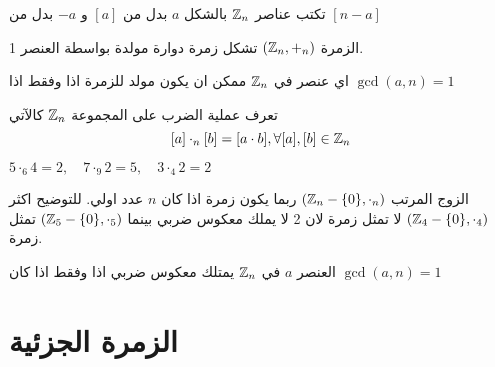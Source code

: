 \begin{note}
	تكتب عناصر $\mathbb{Z}_n$ بالشكل $a$ بدل من $[a]$ و $-a$ بدل من $[n-a]$
\end{note}

\begin{theorem}
	الزمرة $(\mathbb{Z}_n, +_n)$ تشكل زمرة دوارة مولدة بواسطة العنصر 1.
\end{theorem}

\begin{note}
	اي عنصر في $\mathbb{Z}_n$ ممكن ان يكون مولد للزمرة اذا وفقط اذا $\gcd(a,n)=1$
\end{note}
\begin{note}
 تعرف عملية الضرب على المجموعة $\mathbb{Z}_n$ كالآتي 
\[
[a] \cdot_n [b] = [a\cdot b] , \forall [a],[b] \in \mathbb{Z}_n
\]
\end{note}

\begin{example}
	$5\cdot_6 4 =2,\quad 7\cdot_9 2=5,\quad 3\cdot_4 2=2$
\end{example}

\begin{note}
	الزوج المرتب $(\mathbb{Z}_n - \{0\}, \cdot_n)$ ربما يكون زمرة اذا كان $n$ عدد اولي. للتوضيح اكثر $(\mathbb{Z}_4-\{0\}, \cdot_4)$ لا تمثل زمرة لان 2 لا يملك معكوس ضربي بينما $(\mathbb{Z}_5-\{0\},\cdot_5)$ تمثل زمرة.
\end{note}

\begin{note}
	العنصر $a$ في $\mathbb{Z}_n$ يمتلك معكوس ضربي اذا وفقط اذا كان $\gcd(a,n)=1$
\end{note}

\section{الزمرة الجزئية}

